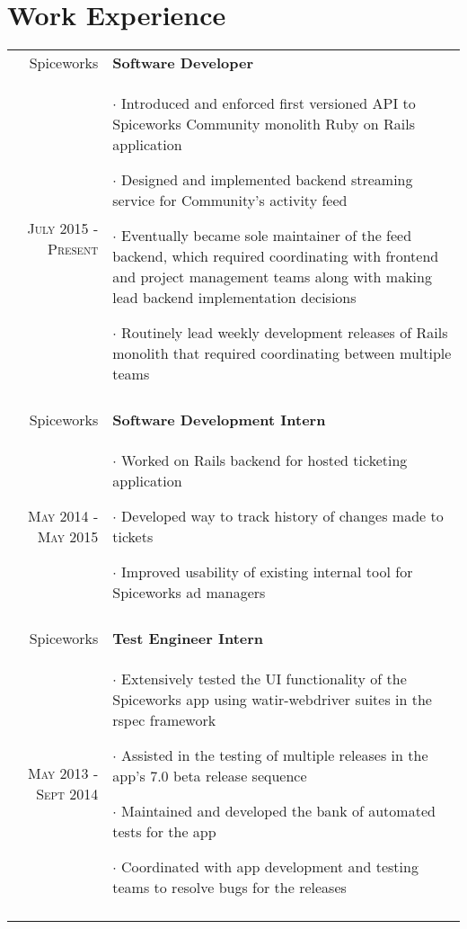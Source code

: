 \documentclass[a4paper,10pt]{article}
\begin{document}
\section{Work Experience}
\begin{tabular}{r|p{11cm}}
  Spiceworks & \textbf{Software Developer} \\
  \textsc{July 2015 - Present} &
    \footnotesize{
      $\cdot$ Introduced and enforced first versioned API to Spiceworks Community monolith Ruby on Rails application

      $\cdot$ Designed and implemented backend streaming service for
      Community's activity feed

      $\cdot$ Eventually became sole maintainer of the feed backend, which required coordinating with frontend and project management teams along with making lead backend implementation decisions

      $\cdot$ Routinely lead weekly development releases of Rails monolith
      that required coordinating between multiple teams

    }
    \\\multicolumn{2}{c}{} \\

  Spiceworks & \textbf{Software Development Intern} \\
  \textsc{May 2014 - May 2015} &
    \footnotesize{
      $\cdot$ Worked on Rails backend for hosted ticketing application

      $\cdot$ Developed way to track history of changes made to tickets

      $\cdot$ Improved usability of existing internal tool for Spiceworks ad managers

    }
    \\\multicolumn{2}{c}{} \\

  Spiceworks & \textbf{Test Engineer Intern} \\
  \textsc{May 2013 - Sept 2014} &
    \footnotesize{
      $\cdot$ Extensively tested the UI functionality of the Spiceworks
      app using watir-webdriver suites in the rspec framework

      $\cdot$ Assisted in the testing of multiple releases in the app’s
      7.0 beta release sequence

      $\cdot$ Maintained and developed the bank of automated tests for the
      app

      $\cdot$ Coordinated with app development and testing teams to
      resolve bugs for the releases

    }
    \\\multicolumn{2}{c}{} \\

\end{tabular}
\end{document}
